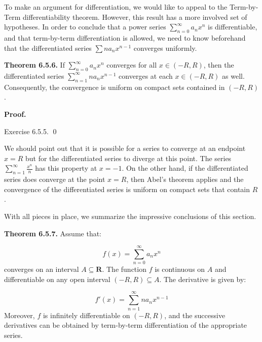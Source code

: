 \documentclass[10pt]{article}
\begin{document}
To make an argument for differentiation, we would like to appeal to the Term-by-Term differentiability theorem. However, this result has a more involved set of hypotheses. In order to conclude that a power series $\displaystyle \sum _{n=0}^{\infty } a_{n} x^{n}$ is differentiable, and that term-by-term differentiation is allowed, we need to know beforehand that the differentiated series $\displaystyle \sum na_{n} x^{n-1}$ converges uniformly.



\textbf{Theorem 6.5.6.} If $\displaystyle \sum _{n=0}^{\infty } a_{n} x^{n}$ converges for all $\displaystyle x\in ( -R,R)$, then the differentiated series $\displaystyle \sum _{n=1}^{\infty } na_{n} x^{n-1}$ converges at each $\displaystyle x\in ( -R,R)$ as well. Consequently, the convergence is uniform on compact sets contained in $\displaystyle ( -R,R)$. 



\textbf{Proof.}

Exercise 6.5.5. \qed 



We should point out that it is possible for a series to converge at an endpoint $\displaystyle x=R$ but for the differentiated series to diverge at this point. The series $\displaystyle \sum _{n=1}^{\infty }\frac{x^{n}}{n}$ has this property at $\displaystyle x=-1$. On the other hand, if the differentiated series does converge at the point $\displaystyle x=R$, then Abel's theorem applies and the convergence of the differentiated series is uniform on compact sets that contain $\displaystyle R$. 



With all pieces in place, we summarize the impressive conclusions of this section. 



\textbf{Theorem 6.5.7.} Assume that:


\begin{equation*}
f( x) =\sum _{n=0}^{\infty } a_{n} x^{n}
\end{equation*}
converges on an interval $\displaystyle A\subseteq \mathbf{R}$. The function $\displaystyle f$ is continuous on $\displaystyle A$ and differentiable on any open interval $\displaystyle ( -R,R) \subseteq A$. The derivative is given by:


\begin{equation*}
f'( x) =\sum _{n=1}^{\infty } na_{n} x^{n-1}
\end{equation*}
Moreover, $\displaystyle f$ is infinitely differentiable on $\displaystyle ( -R,R)$, and the successive derivatives can be obtained by term-by-term differentiation of the appropriate series. 
\end{document}
